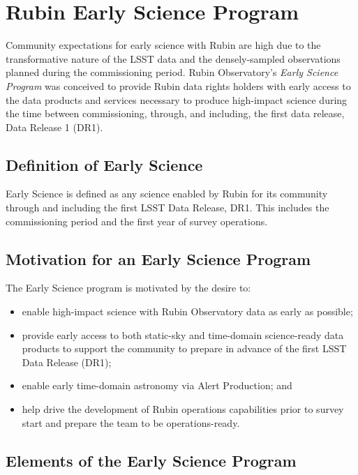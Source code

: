 \section{Rubin Early Science Program}

Community expectations for early science with Rubin are high due to the transformative nature of the LSST data and the densely-sampled observations planned during the commissioning period.
Rubin Observatory's \emph{Early Science Program} was conceived to provide Rubin data rights holders with early access to the data products and services necessary to produce high-impact  science during the  time between commissioning, through, and including, the first data release, Data Release 1 (DR1). 

\subsection{Definition of Early Science}  \label{ssec:defn}
Early Science is defined as any science enabled by Rubin for its community through and including the first LSST Data Release, DR1.
 This includes the commissioning period and the first year of survey operations.

\subsection{Motivation for an Early Science Program}  \label{ssec:motivation}

The Early Science program is motivated by the desire to:
\begin{itemize}
\item enable high-impact science with Rubin Observatory data  as early as possible;
\item provide early access to both static-sky and time-domain science-ready data products to support the community to prepare in advance of the first LSST Data Release (DR1);
\item enable early time-domain astronomy via Alert Production; and 
\item help drive the development of Rubin operations capabilities prior to survey start and prepare the team to be operations-ready.
\end{itemize}

\subsection{Elements of the Early Science Program}

